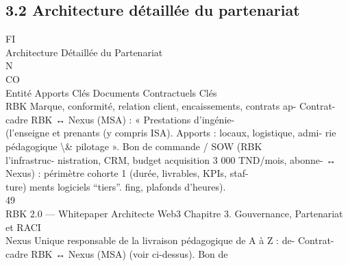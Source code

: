 \subsection{3.2 Architecture détaillée du partenariat}
\vspace{0.5em}
\vspace{0.5em}
\vspace{0.5em}
\vspace{0.5em}
FI\\
Architecture Détaillée du Partenariat\\
\vspace{0.5em}
\vspace{0.5em}
\vspace{0.5em}
N\\
CO\\
Entité            Apports Clés                                                           Documents Contractuels Clés\\
\vspace{0.5em}
RBK               Marque, conformité, relation client, encaissements, contrats ap- Contrat-cadre RBK ↔ Nexus (MSA) : « Prestations d’ingénie-\\
(l’enseigne et    prenants (y compris ISA). Apports : locaux, logistique, admi- rie pédagogique \textbackslash{}& pilotage ». Bon de commande / SOW (RBK\\
l’infrastruc-     nistration, CRM, budget acquisition 3 000 TND/mois, abonne- ↔ Nexus) : périmètre cohorte 1 (durée, livrables, KPIs, staf-\\
ture)             ments logiciels “tiers”.                                         fing, plafonds d’heures).\\
\vspace{0.5em}
\vspace{0.5em}
\vspace{0.5em}
\vspace{0.5em}
49\\
RBK 2.0 — Whitepaper Architecte Web3                                                                            Chapitre 3. Gouvernance, Partenariat et RACI\\
\vspace{0.5em}
\vspace{0.5em}
\vspace{0.5em}
\vspace{0.5em}
Nexus             Unique responsable de la livraison pédagogique de A à Z : de- Contrat-cadre RBK ↔ Nexus (MSA) (voir ci-dessus). Bon de\\
